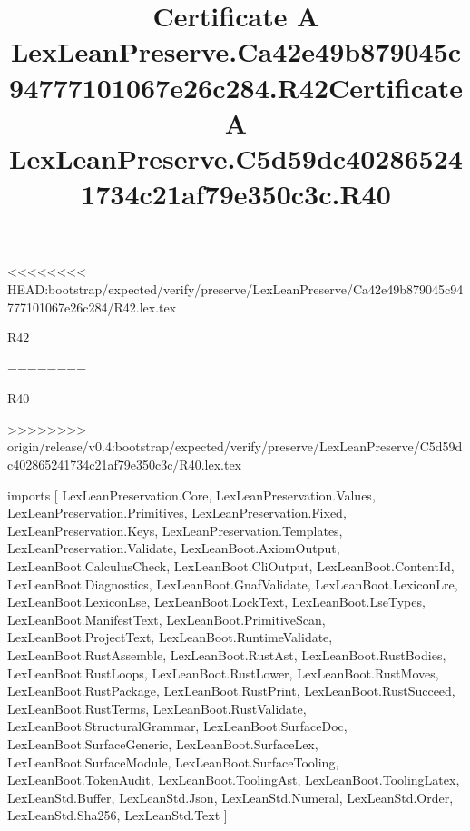 <<<<<<<< HEAD:bootstrap/expected/verify/preserve/LexLeanPreserve/Ca42e49b879045c94777101067e26c284/R42.lex.tex
\begin{lexlean}{R42}
\title{Certificate A LexLeanPreserve.Ca42e49b879045c94777101067e26c284.R42}
========
\begin{lexlean}{R40}
\title{Certificate A LexLeanPreserve.C5d59dc402865241734c21af79e350c3c.R40}
>>>>>>>> origin/release/v0.4:bootstrap/expected/verify/preserve/LexLeanPreserve/C5d59dc402865241734c21af79e350c3c/R40.lex.tex
\begin{coremodule}
imports [
  LexLeanPreservation.Core,
  LexLeanPreservation.Values,
  LexLeanPreservation.Primitives,
  LexLeanPreservation.Fixed,
  LexLeanPreservation.Keys,
  LexLeanPreservation.Templates,
  LexLeanPreservation.Validate,
  LexLeanBoot.AxiomOutput,
  LexLeanBoot.CalculusCheck,
  LexLeanBoot.CliOutput,
  LexLeanBoot.ContentId,
  LexLeanBoot.Diagnostics,
  LexLeanBoot.GnafValidate,
  LexLeanBoot.LexiconLre,
  LexLeanBoot.LexiconLse,
  LexLeanBoot.LockText,
  LexLeanBoot.LseTypes,
  LexLeanBoot.ManifestText,
  LexLeanBoot.PrimitiveScan,
  LexLeanBoot.ProjectText,
  LexLeanBoot.RuntimeValidate,
  LexLeanBoot.RustAssemble,
  LexLeanBoot.RustAst,
  LexLeanBoot.RustBodies,
  LexLeanBoot.RustLoops,
  LexLeanBoot.RustLower,
  LexLeanBoot.RustMoves,
  LexLeanBoot.RustPackage,
  LexLeanBoot.RustPrint,
  LexLeanBoot.RustSucceed,
  LexLeanBoot.RustTerms,
  LexLeanBoot.RustValidate,
  LexLeanBoot.StructuralGrammar,
  LexLeanBoot.SurfaceDoc,
  LexLeanBoot.SurfaceGeneric,
  LexLeanBoot.SurfaceLex,
  LexLeanBoot.SurfaceModule,
  LexLeanBoot.SurfaceTooling,
  LexLeanBoot.TokenAudit,
  LexLeanBoot.ToolingAst,
  LexLeanBoot.ToolingLatex,
  LexLeanStd.Buffer,
  LexLeanStd.Json,
  LexLeanStd.Numeral,
  LexLeanStd.Order,
  LexLeanStd.Sha256,
  LexLeanStd.Text
]


\end{coremodule}
\end{lexlean}
\end{lexlean}

